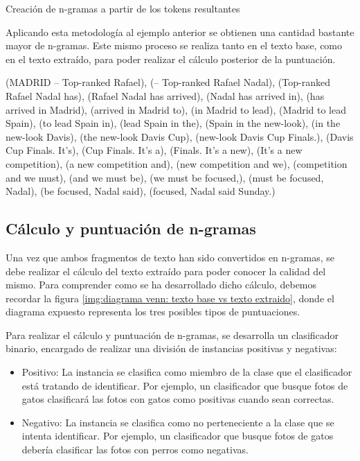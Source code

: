 \begin{codefloat}
  
  \caption{Creación de n-gramas a partir de los tokens resultantes}
  \label{cod:creacion de n-gramas a partir de los tokens resultantes}
\end{codefloat}

Aplicando esta metodología al ejemplo anterior se obtienen una cantidad bastante mayor de n-gramas. Este
mismo proceso se realiza tanto en el texto base, como en el texto extraído, para poder realizar el cálculo
posterior de la puntuación.

\begin{Schunk}
  \begin{Soutput}
(MADRID -- Top-ranked Rafael), (-- Top-ranked Rafael Nadal), 
(Top-ranked Rafael Nadal has), (Rafael Nadal has arrived), 
(Nadal has arrived in), (has arrived in Madrid), (arrived in Madrid to), 
(in Madrid to lead), (Madrid to lead Spain), (to lead Spain in), 
(lead Spain in the), (Spain in the new-look), (in the new-look Davis), 
(the new-look Davis Cup), (new-look Davis Cup Finals.), (Davis Cup Finals. It’s),
(Cup Finals. It’s a), (Finals. It’s a new), (It’s a new competition),
(a new competition and), (new competition and we), (competition and we must), 
(and we must be), (we must be focused,), (must be focused, Nadal),
(be focused, Nadal said), (focused, Nadal said Sunday.)
  \end{Soutput}
\end{Schunk}

\subsection{Cálculo y puntuación de n-gramas}
\label{subsec:calculo y puntuacion de n-gramas}

Una vez que ambos fragmentos de texto han sido convertidos en n-gramas, se debe realizar el cálculo del
texto extraído para poder conocer la calidad del mismo. Para comprender como se ha desarrollado dicho
cálculo, debemos recordar la figura \ref{img:diagrama venn: texto base vs texto extraido}, donde el 
diagrama expuesto representa los tres posibles tipos de puntuaciones.

Para realizar el cálculo y puntuación de n-gramas, se desarrolla un clasificador binario, encargado de
realizar una división de instancias positivas y negativas:

\begin{itemize}
  \item Positivo: La instancia se clasifica como miembro de la clase que el clasificador está tratando de 
  identificar. Por ejemplo, un clasificador que busque fotos de gatos clasificará las fotos con gatos como 
  positivas cuando sean correctas.
  \item Negativo: La instancia se clasifica como no perteneciente a la clase que se intenta identificar. 
  Por ejemplo, un clasificador que busque fotos de gatos debería clasificar las fotos con perros como 
  negativas.
\end{itemize}

